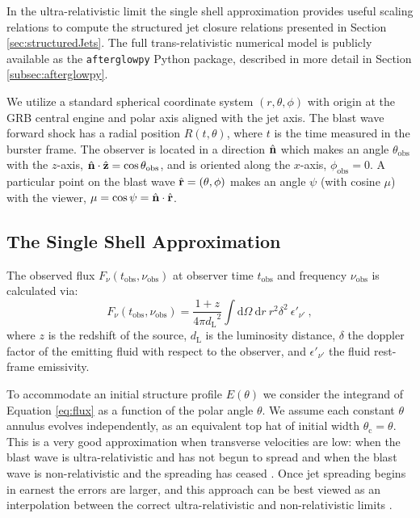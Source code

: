 \documentclass[twocolumn]{aastex62}
\newcommand{\afterglowpy}{{\tt afterglowpy}}
\newcommand{\dd}{\ensuremath{\mathrm{d}}}
\newcommand{\tobs}{\ensuremath{t_{\mathrm{obs}}}}
\newcommand{\nuobs}{\ensuremath{\nu_{\mathrm{obs}}}}
\newcommand{\thobs}{\ensuremath{\theta_{\mathrm{obs}}}}
\newcommand{\phobs}{\ensuremath{\phi_{\mathrm{obs}}}}
\newcommand{\thC}{\ensuremath{\theta_{\mathrm{c}}}}
\newcommand{\dL}{\ensuremath{d_{\mathrm{L}}}}
\begin{document}
In the ultra-relativistic limit the single shell approximation provides useful scaling relations to compute the structured jet closure relations presented in Section \ref{sec:structuredJets}.  The full trans-relativistic numerical model is publicly available as the \afterglowpy{} Python package, described in more detail in Section \ref{subsec:afterglowpy}.

We utilize a standard spherical coordinate system $(r, \theta, \phi)$ with origin at the GRB central engine and polar axis aligned with the jet axis.  The blast wave forward shock has a radial position $R(t, \theta)$, where $t$ is the time measured in the burster frame. The observer is located in a direction $\hat{\bf n}$ which makes an angle $\thobs$ with the $z$-axis, $\hat{\bf n} \cdot \hat{\bf z} = \cos \thobs$, and is oriented along the $x$-axis, $\phobs = 0$.  A particular point on the blast wave $\hat{\bf r} = (\theta, \phi)$ makes an angle $\psi$ (with cosine $\mu$) with the viewer, $\mu = \cos \psi = \hat{\bf n} \cdot \hat{\bf r}$.

\subsection{The Single Shell Approximation}\label{subsec:algo}

The observed flux $F_\nu(\tobs, \nuobs)$ at observer time $\tobs$ and frequency $\nuobs$ is calculated via:
\begin{equation}
	F_\nu(\tobs, \nuobs) = \frac{1+z}{4\pi \dL^2} \int \! \dd \Omega\  \dd r\ r^2 \delta^2\ \epsilon'_{\nu'} \ , \label{eq:flux}
\end{equation}
where $z$ is the redshift of the source, $\dL$ is the luminosity distance, $\delta$ the doppler factor of the emitting fluid with respect to the observer, and $\epsilon'_{\nu'}$ the fluid rest-frame emissivity.

To accommodate an initial structure profile $E(\theta)$ we consider the integrand of Equation \eqref{eq:flux} as a function of the polar angle $\theta$.  We assume each constant $\theta$ annulus evolves independently, as an equivalent top hat of initial width $\thC = \theta$.  This is a very good approximation when transverse velocities are low: when the blast wave is ultra-relativistic and has not begun to spread and when the blast wave is non-relativistic and the spreading has ceased \citep{van-Eerten:2010aa}.  Once jet spreading begins in earnest the errors are larger, and this approach can be best viewed as an interpolation between the correct ultra-relativistic and non-relativistic limits \citep{van-Eerten:2010aa}.
 
\end{document}
